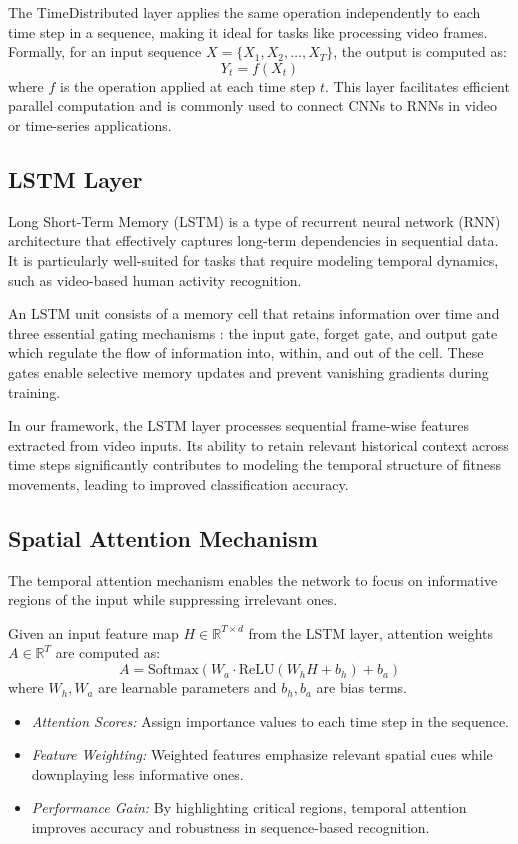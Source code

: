 \documentclass[conference]{IEEEtran}
\begin{document}
The TimeDistributed layer applies the same operation independently to each time step in a sequence, making it ideal for tasks like processing video frames. Formally, for an input sequence \( X = \{X_1, X_2, \dots, X_T\} \), the output is computed as:
\begin{equation}
Y_t = f(X_t)
\end{equation}
where \( f \) is the operation applied at each time step \( t \). This layer facilitates efficient parallel computation and is commonly used to connect CNNs to RNNs in video or time-series applications.

\subsection{LSTM Layer}

Long Short-Term Memory (LSTM) is a type of recurrent neural network (RNN) architecture that effectively captures long-term dependencies in sequential data. It is particularly well-suited for tasks that require modeling temporal dynamics, such as video-based human activity recognition. 

An LSTM unit consists of a memory cell that retains information over time and three essential gating mechanisms : the input gate, forget gate, and output gate which regulate the flow of information into, within, and out of the cell. These gates enable selective memory updates and prevent vanishing gradients during training.

In our framework, the LSTM layer processes sequential frame-wise features extracted from video inputs. Its ability to retain relevant historical context across time steps significantly contributes to modeling the temporal structure of fitness movements, leading to improved classification accuracy.

\subsection{Spatial Attention Mechanism}

The temporal attention mechanism enables the network to focus on informative regions of the input while suppressing irrelevant ones.

Given an input feature map $H \in \mathbb{R}^{T \times d}$ from the LSTM layer, attention weights $A \in \mathbb{R}^T$ are computed as:
\begin{equation}
A = \text{Softmax}(W_a \cdot \text{ReLU}(W_h H + b_h) + b_a)
\end{equation}
where $W_h, W_a$ are learnable parameters and $b_h, b_a$ are bias terms.
\begin{itemize}
    \item \textit{Attention Scores:} Assign importance values to each time step in the sequence.  
    \item \textit{Feature Weighting:} Weighted features emphasize relevant spatial cues while downplaying less informative ones.  
    \item \textit{Performance Gain:} By highlighting critical regions, temporal attention improves accuracy and robustness in sequence-based recognition.  
\end{itemize}
\end{document}
